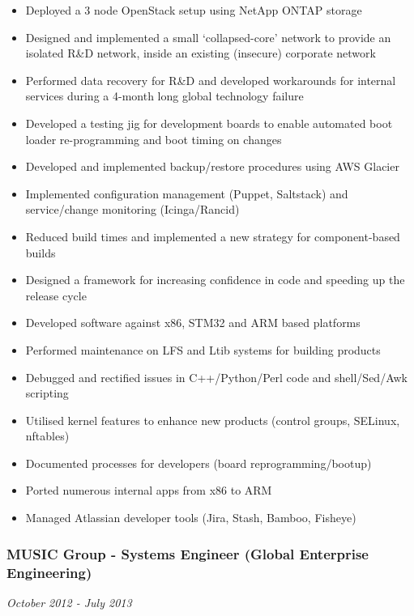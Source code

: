 \begin{itemize}
\itemsep1pt\parskip0pt
\item
  Deployed a 3 node OpenStack setup using NetApp ONTAP storage
\item
  Designed and implemented a small `collapsed-core' network to provide
  an isolated R\&D network, inside an existing (insecure) corporate
  network
\item
  Performed data recovery for R\&D and developed workarounds for
  internal services during a 4-month long global technology failure
\item
  Developed a testing jig for development boards to enable automated
  boot loader re-programming and boot timing on changes
\item
  Developed and implemented backup/restore procedures using AWS Glacier
\item
  Implemented configuration management (Puppet, Saltstack) and
  service/change monitoring (Icinga/Rancid)
\item
  Reduced build times and implemented a new strategy for component-based
  builds
\item
  Designed a framework for increasing confidence in code and speeding up
  the release cycle
\item
  Developed software against x86, STM32 and ARM based platforms
\item
  Performed maintenance on LFS and Ltib systems for building products
\item
  Debugged and rectified issues in C++/Python/Perl code and
  shell/Sed/Awk scripting
\item
  Utilised kernel features to enhance new products (control groups,
  SELinux, nftables)
\item
  Documented processes for developers (board reprogramming/bootup)
\item
  Ported numerous internal apps from x86 to ARM
\item
  Managed Atlassian developer tools (Jira, Stash, Bamboo, Fisheye)
\end{itemize}

\subsubsection{MUSIC Group - Systems Engineer (Global Enterprise
Engineering)}\label{music-group---systems-engineer-global-enterprise-engineering}

\emph{October 2012 - July 2013}

